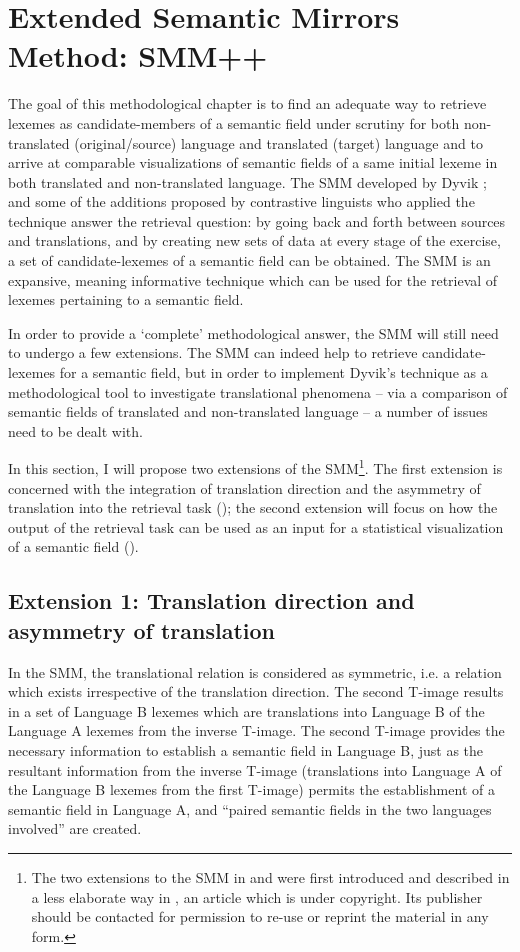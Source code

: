 \section{Extended Semantic Mirrors Method: SMM++}
\label{sec:3.5}
The goal of this methodological chapter is to find an adequate way to retrieve lexemes as candidate-members of a semantic field under scrutiny for both non-translated (original/source) language and translated (target) language and to arrive at comparable visualizations of semantic fields of a same initial lexeme in both translated and non-translated language. The SMM developed by Dyvik \citep{johansson_translational_1998}; \citep{langemets_translations_2005} and some of the additions proposed by contrastive linguists who applied the technique answer the retrieval\textbf{ }question: by going back and forth between sources and translations, and by creating new sets of data at every stage of the exercise, a set of candidate-lexemes of a semantic field can be obtained. The SMM is an expansive, meaning informative technique which can be used for the retrieval of lexemes pertaining to a semantic field.

In order to provide a ‘complete’ methodological answer, the SMM will still need to undergo a few extensions. The SMM can indeed help to retrieve candidate-lexemes for a semantic field, but in order to implement Dyvik’s technique as a methodological tool to investigate translational phenomena – via a comparison of semantic fields of translated and non-translated language – a number of issues need to be dealt with.

In this section, I will propose two extensions of the SMM\footnote{The two extensions to the SMM in  and  were first introduced and described in a less elaborate way in \citet{vandevoorde_corpus-based_2017}, an article which is under copyright. Its publisher should be contacted for permission to re-use or reprint the material in any form.}. The first extension is concerned with the integration of translation direction and the asymmetry of translation into the retrieval task (); the second extension will focus on how the output of the retrieval task can be used as an input for a statistical visualization of a semantic field ().

\subsection{Extension 1: Translation direction and asymmetry of translation}
\label{sec:3.5.1}
In the SMM, the translational relation is considered as symmetric, i.e. a relation which exists irrespective of the translation direction. The second T-image results in a set of Language B lexemes which are translations into Language B of the Language A lexemes from the inverse T-image. The second T-image provides the necessary information to establish a semantic field in Language B, just as the resultant information from the inverse T-image (translations into Language A of the Language B lexemes from the first T-image) permits the establishment of a semantic field in Language A, and “paired semantic fields in the two languages involved” \citep[33]{langemets_translations_2005} are created.

